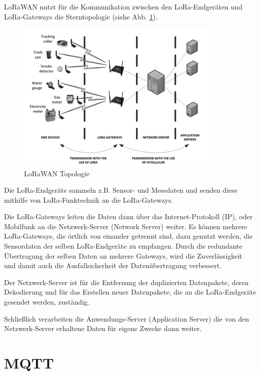 LoRaWAN nutzt für die Kommunikation zwischen den LoRa-Endgeräten und LoRa-Gateways die Sterntopologie (siehe Abb. \ref{fig:lorawan-topology}).

\begin{figure}[h]
 \centering
 \includegraphics[width=0.9\textwidth]{pictures/lorawan-topology}
 \caption[LoRaWAN Topologie]{LoRaWAN Topologie \cite{Staniec2020}}
 \label{fig:lorawan-topology}
\end{figure}

Die LoRa-Endgeräte sammeln z.B. Sensor- und Messdaten und senden diese mithilfe von LoRa-Funktechnik an die LoRa-Gateways. 

Die LoRa-Gateways leiten die Daten dann über das Internet-Protokoll (IP), oder Mobilfunk an die Netzwerk-Server (Network Server) weiter. Es können mehrere LoRa-Gateways, die örtlich von einander getrennt sind, dazu genutzt werden, die Sensordaten der selben LoRa-Endgeräte zu empfangen. Durch die redundante Übertragung der selben Daten an mehrere Gateways, wird die Zuverlässigkeit und damit auch die Ausfallsicherheit der Datenübertragung verbessert.

Der Netzwerk-Server ist für die Entfernung der duplizierten Datenpakete, deren Dekodierung und für das Erstellen neuer Datenpakete, die an die LoRa-Endgeräte gesendet werden, zuständig. 

Schließlich verarbeiten die Anwendungs-Server (Application Server) die von den Netzwerk-Server erhaltene Daten für eigene Zwecke dann weiter. 


\section{MQTT} \label{MQTT}

